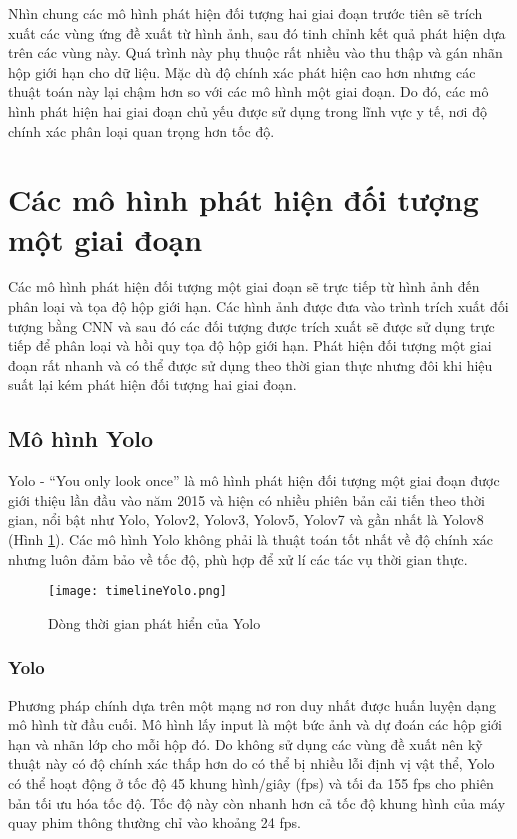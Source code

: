 \documentclass[../the.tex]{subfiles}
\begin{document}
{\fontsize{13}{12} \selectfont  
Nhìn chung các mô hình phát hiện đối tượng hai giai đoạn
trước tiên sẽ trích xuất các vùng ứng đề xuất từ hình ảnh, sau đó tinh chỉnh kết quả phát hiện dựa trên các vùng này. Quá trình này phụ thuộc rất nhiều vào thu thập và gán nhãn hộp giới hạn cho dữ liệu. 
Mặc dù độ chính xác phát hiện cao hơn nhưng các thuật toán này lại chậm hơn so với các mô hình một giai đoạn.
Do đó, các mô hình phát hiện hai giai đoạn chủ yếu được sử dụng trong lĩnh vực y tế, nơi độ chính xác phân loại quan trọng hơn tốc độ.
}


\section{Các mô hình phát hiện đối tượng một giai đoạn}
{\fontsize{13}{12} \selectfont 	
Các mô hình phát hiện đối tượng một giai đoạn sẽ trực tiếp từ hình ảnh đến phân loại và tọa độ hộp giới hạn. 
Các hình ảnh được đưa vào trình trích xuất đối tượng bằng CNN và sau đó các đối tượng được trích xuất sẽ được sử dụng trực tiếp để phân loại và hồi quy tọa độ hộp giới hạn.
Phát hiện đối tượng một giai đoạn rất nhanh và có thể được sử dụng theo thời gian thực nhưng đôi khi hiệu suất lại kém phát hiện đối tượng hai giai đoạn.


\subsection{Mô hình Yolo}}
{\fontsize{13}{12} \selectfont 	
Yolo - “You only look once” \cite{redmon2016look} là mô hình phát hiện đối tượng một giai đoạn được giới thiệu lần đầu vào năm 2015 và hiện có nhiều phiên bản cải tiến theo thời gian,
nổi bật như Yolo, Yolov2, Yolov3, Yolov5, Yolov7 và gần nhất là Yolov8 (Hình \ref{fig:timelimeyolo}). Các mô hình Yolo không phải là thuật toán tốt nhất về độ chính xác nhưng luôn đảm bảo về tốc độ, phù hợp để xử lí các tác vụ thời gian thực.
}
\begin{figure}[H]
	\centering
	\texttt{[image: timelineYolo.png]}
	\caption{Dòng thời gian phát hiển của Yolo}
	\label{fig:timelimeyolo}
\end{figure}
\bigskip

\subsubsection{Yolo}
{\fontsize{13}{12} \selectfont
Phương pháp chính dựa trên một mạng nơ ron duy nhất được huấn luyện dạng mô hình từ đầu cuối. 
Mô hình lấy input là một bức ảnh và dự đoán các hộp giới hạn và nhãn lớp cho mỗi hộp đó. 
Do không sử dụng các vùng đề xuất nên kỹ thuật này có độ chính xác thấp hơn do có thể bị nhiều lỗi định vị vật thể, 
Yolo có thể hoạt động ở tốc độ 45 khung hình/giây (fps) và tối đa 155 fps cho phiên bản tối ưu hóa tốc độ. Tốc độ này còn nhanh hơn cả tốc độ khung hình của máy quay phim thông thường chỉ vào khoảng 24 fps.

}
\end{document}
